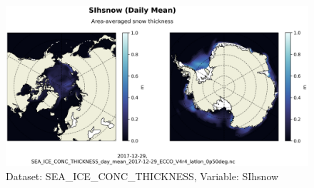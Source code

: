 \begin{figure}[H]
\centering
\includegraphics[scale=0.55]{../images/plots/latlon_plots/Sea-Ice_and_Snow_Concentration_and_Thickness/SIhsnow.png}
\caption{Dataset: SEA\_ICE\_CONC\_THICKNESS, Variable: SIhsnow}
\label{tab:table-SEA_ICE_CONC_THICKNESS_SIhsnow-Plot}
\end{figure}
\pagebreak
